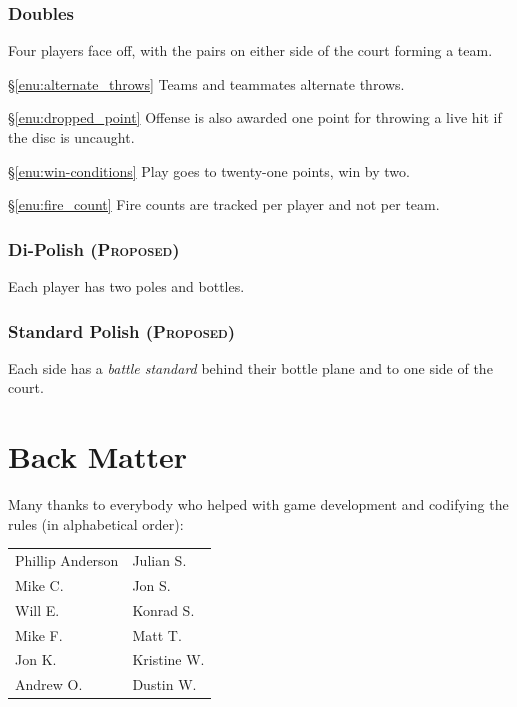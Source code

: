 \documentclass[11pt,letterpaper,twocolumn,english,DIV=calc]{scrartcl}
\newcommand{\proposed}{{\color{DarkRed}\textsc{(Proposed)} }}
\begin{document}
\section{Doubles}
Four players face off, with the pairs on either side of the court forming a team. 

\begin{description}
	\item{\S\ref{enu:alternate_throws}} Teams and teammates alternate throws. 
	\item{\S\ref{enu:dropped_point}} Offense is also awarded one point for throwing a live hit if the disc is uncaught.
	\item{\S\ref{enu:win-conditions}} Play goes to twenty-one points, win by two.
	\item{\S\ref{enu:fire_count}} Fire counts are tracked per player and not per team.
\end{description}

\section{Di-Polish \proposed}
Each player has two poles and bottles.

\section{Standard Polish \proposed}
Each side has a \emph{battle standard} behind their bottle plane and to one side of the court.


\newpage

\part*{Back Matter}


Many thanks to everybody who helped with game development and codifying the rules (in alphabetical order):\medskip{}

\begin{tabular}{>{\raggedright}p{3.5cm}>{\raggedright}p{2.5cm}}
	Phillip Anderson & Julian S.\tabularnewline
	Mike C. & Jon S.\tabularnewline
	Will E. & Konrad S.\tabularnewline
	Mike F. & Matt T.\tabularnewline
	Jon K. & Kristine W.\tabularnewline
	Andrew O. & Dustin W.\tabularnewline
\end{tabular}
\end{document}
